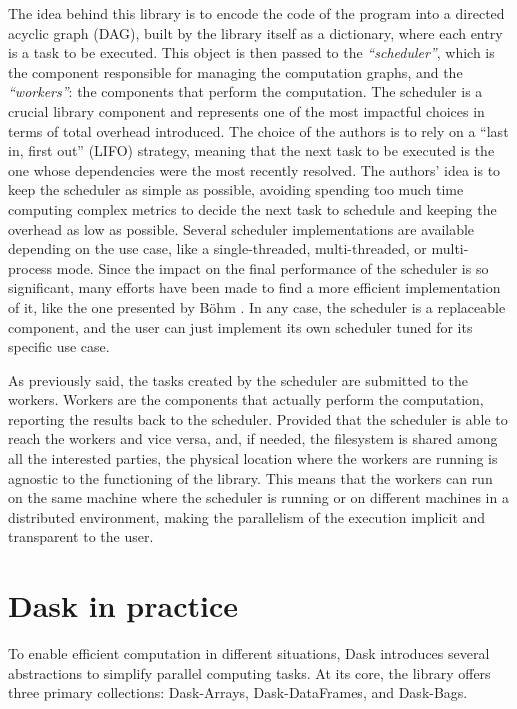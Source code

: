 The idea behind this library is to encode the code of the program into a
directed acyclic graph (DAG), built by the library itself as a dictionary,
where each entry is a task to be executed.
This object is then passed to the \textit{``scheduler''}, which is the component
responsible for managing the computation graphs, and the \textit{``workers''}:
the components that perform the computation.
The scheduler is a crucial library component and represents one of the most
impactful choices in terms of total overhead introduced.
The choice of the authors is to rely on a ``last in, first out'' (LIFO)
strategy, meaning that the next task to be executed is the one whose
dependencies were the most recently resolved.
The authors' idea is to keep the scheduler as simple as possible, avoiding
spending too much time computing complex metrics to decide the next task to
schedule and keeping the overhead as low as possible.
Several scheduler implementations are available depending on the use case, like
a single-threaded, multi-threaded, or multi-process mode.
Since the impact on the final performance of the scheduler is so significant,
many efforts have been made to find a more efficient implementation of it, like
the one presented by B{\"o}hm \cite{bohm2020}. In any case, the scheduler is a
replaceable component, and the user can just implement its own scheduler tuned
for its specific use case.

As previously said, the tasks created by the scheduler are submitted to the
workers. Workers are the components that actually perform the computation,
reporting the results back to the scheduler.
Provided that the scheduler is able to reach the workers and vice versa, and, if
needed, the filesystem is shared among all the interested parties, the physical
location where the workers are running is agnostic to the functioning of the
library. This means that the workers can run on the same machine where the
scheduler is running or on different machines in a distributed environment,
making the parallelism of the execution implicit and transparent to the user.

\section{Dask in practice}\label{sec:daskcloud}

To enable efficient computation in different situations, Dask introduces several
abstractions to simplify parallel computing tasks.
At its core, the library offers three primary collections: Dask-Arrays,
Dask-DataFrames, and Dask-Bags.

